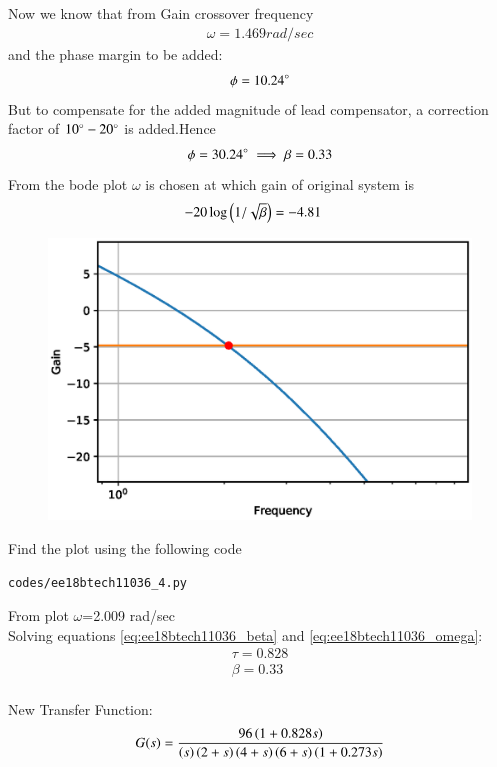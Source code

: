 \begin{enumerate}[label=\thesection.\arabic*.,ref=\thesection.\theenumi]
Now we know that from Gain crossover frequency
\begin{align}
\omega =1.469 rad/sec
\end{align}
and the phase margin to be added:
\begin{align}
\phi =10.24\degree
\end{align}
But to compensate for the added magnitude of lead compensator, a correction factor of $10\degree-20\degree$
is added.Hence
\begin{align}
\phi =30.24\degree
\implies \beta=0.33
\end{align}
From the bode plot $\omega$ is chosen at which gain of original system is
\begin{align}
-20\log\left(1/\sqrt{\beta}\right)&=-4.81
\end{align}
\begin{figure}[!ht]
  \centering
  \includegraphics[width=\columnwidth]{./figs/ee18btech11036_3.eps}
  \caption{}
  \label{fig:ee18btech11036_3}
\end{figure}
Find the plot using the following code
\begin{lstlisting}
codes/ee18btech11036_4.py
\end{lstlisting}
From plot $\omega$=2.009 rad/sec\\
Solving equations \ref{eq:ee18btech11036_beta} and \ref{eq:ee18btech11036_omega}:
\begin{align}
\tau= 0.828\\
\beta=0.33\\
\label{eq:ee18btech11036_final}
\end{align}

New Transfer Function:
\begin{align}
G(s)=\frac{96\left(1+ 0.828s\right)}{\left(s\right)\left(2+s\right)\left(4+s\right)\left(6+s\right)\left(1+0.273s\right)}
\end{align}



\end{enumerate}
